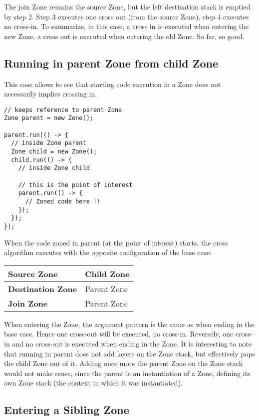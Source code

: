 The join Zone remains the source Zone, but the left destination stack is emptied by step 2. Step 3 executes one cross out (from the source Zone), step 4 executes no cross-in. To summarize, in this case, a cross in is executed when entering the new Zone, a cross out is executed when entering the old Zone. So far, so good.

\subsection*{Running in parent Zone from child Zone}

This case allows to see that starting code execution in a Zone does not necessarily implies crossing in.

\begin{lstlisting}
// keeps reference to parent Zone
Zone parent = new Zone();

parent.run(() -> {
  // inside Zone parent
  Zone child = new Zone();
  child.run(() -> {
    // inside Zone child

    // this is the point of interest
    parent.run(() -> {
      // Zoned code here !!
    });
  });
});
\end{lstlisting}

When the code zoned in parent (at the point of interest) starts, the cross algorithm executes with the opposite configuration of the base case:

\begin{tabular}{| l | l |}
\hline
\textbf{Source Zone} & Child Zone
\\ \hline
\textbf{Destination Zone} & Parent Zone
\\ \hline
\textbf{Join Zone} & Parent Zone
\\ \hline
\end{tabular}

When entering the Zone, the argument pattern is the same as when ending in the base case. Hence one cross-out will be executed, no cross-in. Reversely, one cross-in and no cross-out is executed when ending in the Zone.
It is interesting to note that running in parent does not add layers on the Zone stack, but effectively pops the child Zone out of it. Adding once more the parent Zone on the Zone stack would not make sense, since the parent is an instantiation of a Zone, defining its own Zone stack (the context in which it was instantiated).


\subsection*{Entering a Sibling Zone}

